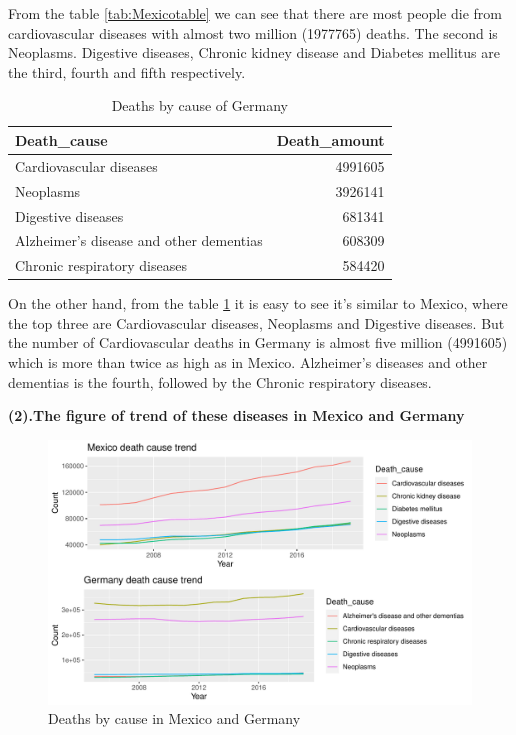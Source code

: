 \documentclass[11pt,a4paper,]{article}
\begin{document}
From the table \ref{tab:Mexicotable} we can see that there are most people die from cardiovascular diseases with almost two million (1977765) deaths. The second is Neoplasms. Digestive diseases, Chronic kidney disease and Diabetes mellitus are the third, fourth and fifth respectively.

\begin{table}

\caption{\label{tab:Germanytable}Deaths by cause of Germany}
\centering
\begin{tabular}[t]{l|r}
\hline
Death\_cause & Death\_amount\\
\hline
Cardiovascular diseases & 4991605\\
\hline
Neoplasms & 3926141\\
\hline
Digestive diseases & 681341\\
\hline
Alzheimer's disease and other dementias & 608309\\
\hline
Chronic respiratory diseases & 584420\\
\hline
\end{tabular}
\end{table}

On the other hand, from the table \ref{tab:Germanytable} it is easy to see it's similar to Mexico, where the top three are Cardiovascular diseases, Neoplasms and Digestive diseases. But the number of Cardiovascular deaths in Germany is almost five million (4991605) which is more than twice as high as in Mexico. Alzheimer's diseases and other dementias is the fourth, followed by the Chronic respiratory diseases.

\textbf{(2).The figure of trend of these diseases in Mexico and Germany}

\begin{figure}
\centering
\includegraphics{Assignment4_files/figure-latex/MexicoAndGermanyfigure-1.pdf}
\caption{\label{fig:MexicoAndGermanyfigure}Deaths by cause in Mexico and Germany}
\end{figure}
\end{document}
